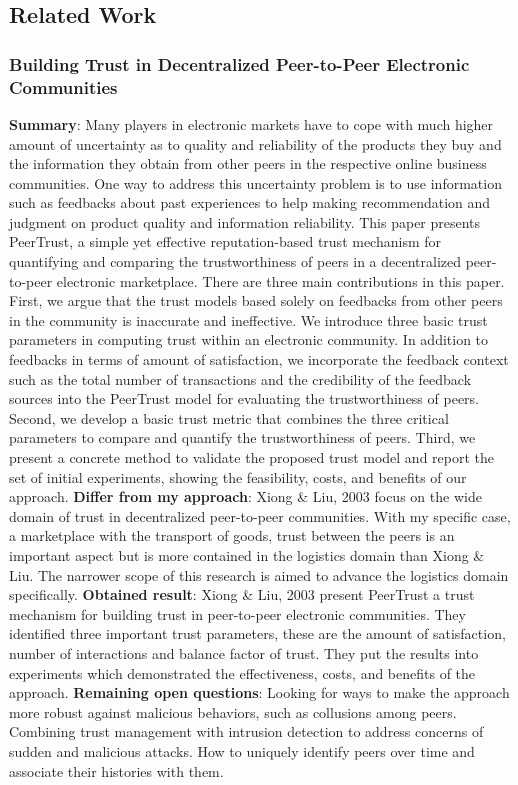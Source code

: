 \subsection{Related Work}

\subsubsection{Building Trust in Decentralized Peer-to-Peer Electronic Communities \cite{buildTrust}}
\textbf{Summary}: Many players in electronic markets have to cope with much higher amount of uncertainty as to quality and reliability of the products they buy and the information they obtain from other peers in the respective online business communities. One way to address this uncertainty problem is to use information such as feedbacks about past experiences to help making recommendation and judgment on product quality and information reliability. This paper presents PeerTrust, a simple yet effective reputation-based trust mechanism for quantifying and comparing the trustworthiness of peers in a decentralized peer-to-peer electronic marketplace. There are three main contributions in this paper. First, we argue that the trust models based solely on feedbacks from other peers in the community is inaccurate and ineffective. We introduce three basic trust parameters in computing trust within an electronic community. In addition to feedbacks in terms of amount of satisfaction, we incorporate the feedback context such as the total number of transactions and the credibility of the feedback sources into the PeerTrust model for evaluating the trustworthiness of peers. Second, we develop a basic trust metric that combines the three critical parameters to compare and quantify the trustworthiness of peers. Third, we present a concrete method to validate the proposed trust model and report the set of initial experiments, showing the feasibility, costs, and benefits of our approach.\newline
\textbf{Differ from my approach}: Xiong \& Liu, 2003 focus on the wide domain of trust in decentralized peer-to-peer communities. With my specific case, a marketplace with the transport of goods, trust between the peers is an important aspect but is more contained in the logistics domain than Xiong \& Liu. The narrower scope of this research is aimed to advance the logistics domain specifically. \newline
\textbf{Obtained result}: Xiong \& Liu, 2003 present PeerTrust a trust mechanism for building trust in peer-to-peer electronic communities. They identified three important trust parameters, these are the amount of satisfaction, number of interactions and balance factor of trust. They put the results into experiments which demonstrated the effectiveness, costs, and benefits of the approach.\newline
\textbf{Remaining open questions}: Looking for ways to make the approach more robust against malicious behaviors, such as collusions among peers. Combining trust management with intrusion detection to address concerns of sudden and malicious attacks. How to uniquely identify peers over time and associate their histories with them.\newline

